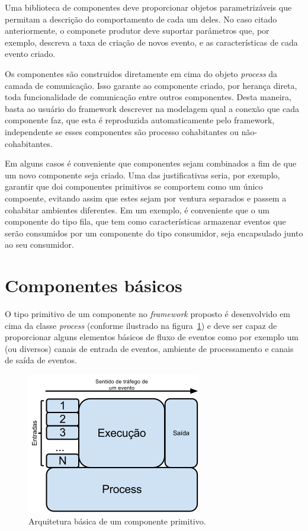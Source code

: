Uma biblioteca de componentes deve proporcionar objetos parametrizáveis que permitam a descrição do comportamento de cada um deles. No caso citado anteriormente, o componete produtor deve suportar parâmetros que, por exemplo, descreva a taxa de criação de novos evento, e as características de cada evento criado.

Os componentes são construidos diretamente em cima do objeto \textit{process} da camada de comunicação. Isso garante ao componente criado, por herança direta, toda funcionalidade de comunicação entre outros componentes. Desta maneira, basta ao usuário do framework descrever na modelagem qual a conexão que cada componente faz, que esta é reproduzida automaticamente pelo framework, independente se esses componentes são processo cohabitantes ou não-cohabitantes.

Em alguns casos é conveniente que componentes sejam combinados a fim de que um novo componente seja criado. Uma das justificativas seria, por exemplo, garantir que doi componentes primitivos se comportem como um único compoente, evitando assim que estes sejam por ventura separados e passem a cohabitar ambientes diferentes. Em um exemplo, é conveniente que o um componente do tipo fila, que tem como características armazenar eventos que serão consumidos por um componente do tipo consumidor, seja encapsulado junto ao seu consumidor.

\section{Componentes básicos}

O tipo primitivo de um componente no \textit{framework} proposto é desenvolvido em cima da classe \textit{process} (conforme ilustrado na figura~\ref{fig:basic_component}) e deve ser capaz de proporcionar alguns elementos básicos de fluxo de eventos como por exemplo um (ou diversos) canais de entrada de eventos, ambiente de processamento e canais de saída de eventos.

\begin{figure}
  \centerline{\includegraphics{basic_component.png}}
  \caption{Arquitetura básica de um componente primitivo.}
\label{fig:basic_component}
\end{figure}

